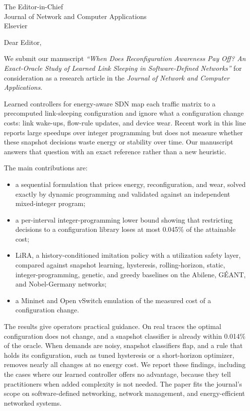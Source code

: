 \documentclass[11pt,a4paper]{letter}
\date{\today}
\begin{document}
\begin{letter}{The Editor-in-Chief\\Journal of Network and Computer Applications\\Elsevier}
\opening{Dear Editor,}

We submit our manuscript \emph{``When Does Reconfiguration Awareness Pay Off? An Exact-Oracle Study of Learned Link Sleeping in Software-Defined Networks''} for consideration as a research article in the \emph{Journal of Network and Computer Applications}.

Learned controllers for energy-aware SDN map each traffic matrix to a precomputed link-sleeping configuration and ignore what a configuration change costs: link wake-ups, flow-rule updates, and device wear. Recent work in this line reports large speedups over integer programming but does not measure whether these snapshot decisions waste energy or stability over time. Our manuscript answers that question with an exact reference rather than a new heuristic.

The main contributions are:
\begin{itemize}
\item a sequential formulation that prices energy, reconfiguration, and wear, solved exactly by dynamic programming and validated against an independent mixed-integer program;
\item a per-interval integer-programming lower bound showing that restricting decisions to a configuration library loses at most 0.045\% of the attainable cost;
\item LiRA, a history-conditioned imitation policy with a utilization safety layer, compared against snapshot learning, hysteresis, rolling-horizon, static, integer-programming, genetic, and greedy baselines on the Abilene, G\'{E}ANT, and Nobel-Germany networks;
\item a Mininet and Open vSwitch emulation of the measured cost of a configuration change.
\end{itemize}

The results give operators practical guidance. On real traces the optimal configuration does not change, and a snapshot classifier is already within 0.014\% of the oracle. When demands are noisy, snapshot classifiers flap, and a rule that holds its configuration, such as tuned hysteresis or a short-horizon optimizer, removes nearly all changes at no energy cost. We report these findings, including the cases where our learned controller offers no advantage, because they tell practitioners when added complexity is not needed. The paper fits the journal's scope on software-defined networking, network management, and energy-efficient networked systems.


\end{letter}
\end{document}
